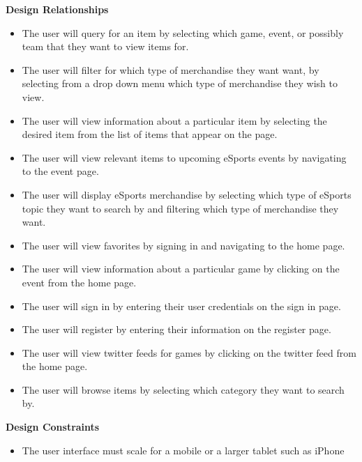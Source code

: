 \documentclass[onecolumn, draftclsnofoot,10pt, compsoc]{IEEEtran}
\begin{document}
       \textbf{Design Relationships}
       \begin{itemize}
       \item The user will query for an item by selecting which game, event, or possibly team that they want to view items for.
       \item The user will filter for which type of merchandise they want want, by selecting from a drop down menu which type of merchandise they wish to view.
       \item The user will view information about a particular item by selecting the desired item from the list of items that appear on the page. 
       \item The user will view relevant items to upcoming eSports events by navigating to the event page.
        \item The user will display eSports merchandise by selecting which type of eSports topic they want to search by and filtering which type of merchandise they want.
        \item The user will view favorites by signing in and navigating to the home page.
        \item The user will view information about a particular game by clicking on the event from the home page. 
        \item The user will sign in by entering their user credentials on the sign in page. 
        \item The user will register by entering their information on the register page. 
        \item The user will view twitter feeds for games by clicking on the twitter feed from the home page. 
        \item The user will browse items by selecting which category they want to search by. 
        \end{itemize}
        \textbf{Design Constraints}
        \begin{itemize} 
        \item The user interface must scale for a mobile or a larger tablet such as iPhone
      	 \end{itemize} 
         
\end{document}
